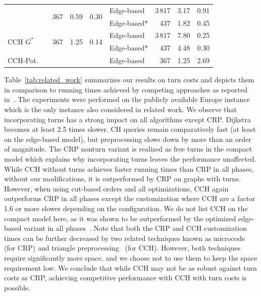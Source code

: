 \documentclass[a4paper, english, cleveref]{lipics-v2021}
\begin{document}
\begin{table}
\begin{tabular}{l@{\hskip4pt}crrrlrrr}
\addlinespace
\multirow{2}{*}{CCH $G^+$}&                                      & \multirow{2}{*}{367} & \multirow{2}{*}{0.59} &   \multirow{2}{*}{0.30} & Edge-based &  3\,817 &    3.17 &       0.91 \\
                          &                                      &                      &                    &                            & Edge-based* &    437 &    1.82 &       0.45 \\
\multirow{2}{*}{CCH $G^*$}&                                      & \multirow{2}{*}{367} & \multirow{2}{*}{1.25} &   \multirow{2}{*}{0.14} & Edge-based &  3\,817 &    7.80 &       0.25 \\
                          &                                      &                      &                    &                            & Edge-based* &    437 &    4.48 &       0.30 \\
CCH-Pot.                  &                                      &                      &                    &                            & Edge-based &     367 &    1.25 &       2.69 \\
\bottomrule
\end{tabular}
\end{table}

Table~\ref{tab:related_work} summarizes our results on turn costs and depicts them in comparison to running times achieved by competing approaches as reported in~\cite{DellingGPW17}.
The experiments were performed on the publicly available Europe instance which is the only instance also considered in related work.
We observe that incorporating turns has a strong impact on all algorithms except CRP.
Dijkstra becomes at least 2.5 times slower.
CH queries remain comparatively fast (at least on the edge-based model), but preprocessing slows down by more than an order of magnitude.
The CRP nonturn variant is realized as free turns in the compact model which explains why incorporating turns leaves the performance unaffected.
While CCH without turns achieves faster running times than CRP in all phases, without our modifications, it is outperformed by CRP on graphs with turns.
However, when using cut-based orders and all optimizations, CCH again outperforms CRP in all phases except the customization where CCH are a factor 1.6 or more slower depending on the configuration.
We do not list CCH on the compact model here, as it was shown to be outperformed by the optimized edge-based variant in all phases~\cite{TODO}.
Note that both the CRP and CCH customization times can be further decreased by two related techniques known as microcode~\cite{DellingW13} (for CRP) and triangle preprocessing~\cite{DibbeltSW16} (for CCH).
However, both techniques require significantly more space, and we choose not to use them to keep the space requirement low.
We conclude that while CCH may not be as robust against turn costs as CRP, achieving competitive performance with CCH with turn costs is possible.
\end{document}
